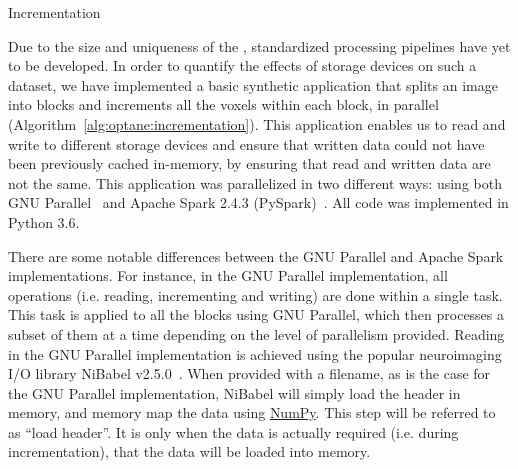\begin{algorithm2e}\caption{Incrementation}\label{alg:optane:incrementation}
     
\end{algorithm2e}  

Due to the size and uniqueness of the \bigbrain, standardized processing
pipelines have yet to be developed. In order to quantify the effects of storage
devices on such a dataset, we have implemented a basic synthetic application
that splits an image into blocks and increments all the voxels within each
block, in parallel (Algorithm~\ref{alg:optane:incrementation}). This application
enables us to read and write to different storage devices and ensure that
written data could not have been previously cached in-memory, by ensuring that
read and written data are not the same. This application was parallelized in two
different ways: using both GNU Parallel~\cite{gnuparallel} and Apache Spark
2.4.3 (PySpark)~\cite{zaharia2016apache}. All code was implemented in Python
3.6.

There are some notable differences between the GNU Parallel and Apache Spark
implementations. For instance, in the GNU Parallel implementation, all
operations (i.e. reading, incrementing and writing) are done within a single
task. This task is applied to all the \bigbrain blocks using GNU Parallel, which
then processes a subset of them at a time depending on the level of parallelism
provided. Reading in the GNU Parallel implementation is achieved using the
popular neuroimaging I/O library NiBabel v2.5.0~\cite{nibabel}. When provided
with a filename, as is the case for the GNU Parallel implementation, NiBabel
will simply load the header in memory, and memory map the data using
\href{https://numpy.org/}{NumPy}. This step will be referred to as ``load
header''. It is only when the data is actually required (i.e. during
incrementation), that the data will be loaded into memory.

